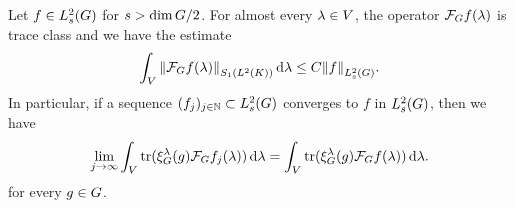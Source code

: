 \begin{lemma}
\label{lemma:preparation_for_general_inverse_formula}
    Let $f \in \Sobolev s$ for $s > \dim \Group / 2$.
    For almost every $\lambda \in \VectorSpace$,
    the operator $\Fourier f(\lambda)$ is trace class and we have the estimate
    \begin{align*}
        \int_\VectorSpace \norm [\SchattenClasses 1 {\Lebesgue 2 \CompactGroup}] {\Fourier f(\lambda)} \dd \lambda
        \leq C \norm [\Sobolev s] f.
    \end{align*}
    In particular,
    if a sequence $(f_j)_{j \in \N} \subset \Sobolev s$ converges to $f$ in $\Sobolev s$,
    then we have
    \begin{align*}
        \lim_{j \to \infty} \int_\VectorSpace \tr(\Rep \lambda (g) \Fourier {f_j}(\lambda)) \dd \lambda
        = \int_\VectorSpace \tr(\Rep \lambda (g) \Fourier f(\lambda)) \dd \lambda.
    \end{align*}
    for every $g \in \Group$.
\end{lemma}
